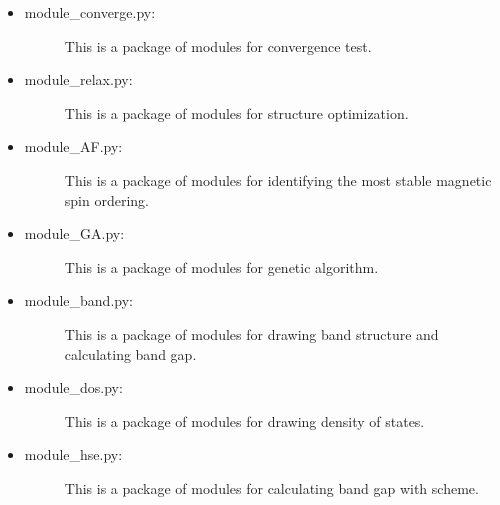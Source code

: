 \documentclass[letterpaper,10pt,english]{sphinxmanual}
\begin{document}
\begin{itemize}
\begin{description}
\end{description}

\item {} \begin{description}
\item[{module\_converge.py:}] \leavevmode
This is a package of modules for convergence test.

\end{description}

\item {} \begin{description}
\item[{module\_relax.py:}] \leavevmode
This is a package of modules for structure optimization.

\end{description}

\item {} \begin{description}
\item[{module\_AF.py:}] \leavevmode
This is a package of modules for identifying the most stable magnetic spin ordering.

\end{description}

\item {} \begin{description}
\item[{module\_GA.py:}] \leavevmode
This is a package of modules for genetic algorithm.

\end{description}

\item {} \begin{description}
\item[{module\_band.py:}] \leavevmode
This is a package of modules for drawing band structure and calculating band gap.

\end{description}

\item {} \begin{description}
\item[{module\_dos.py:}] \leavevmode
This is a package of modules for drawing density of states.

\end{description}

\item {} \begin{description}
\item[{module\_hse.py:}] \leavevmode
This is a package of modules for calculating band gap with  scheme.


\end{description}
\end{itemize}
\end{document}
